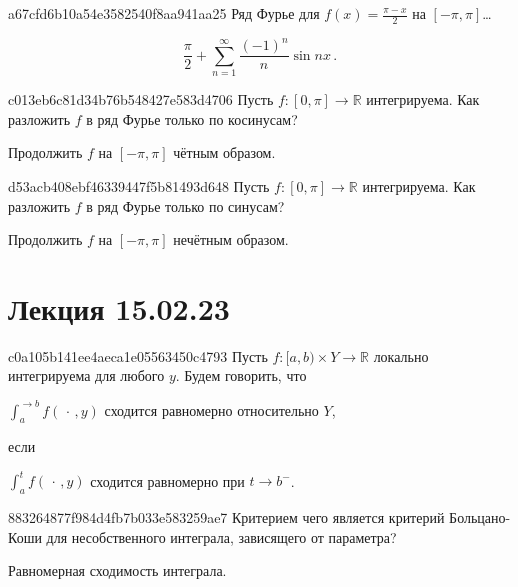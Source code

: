 \begin{note}{a67cfd6b10a54e3582540f8aa941aa25}
    Ряд Фурье для \({ f(x) = \frac{\pi - x}{2} }\) на \({ [-\pi, \pi] }\)\ldots

    \begin{cloze}{1}
        \[
            \frac{\pi}{2} + \sum_{n=1}^{\infty} \frac{(-1)^{n}}{n} \sin nx\,.
        \]
    \end{cloze}
\end{note}

\begin{note}{c013eb6c81d34b76b548427e583d4706}
    Пусть \({ f : [0, \pi] \to \mathbb R }\) интегрируема.
    Как разложить \({ f }\) в ряд Фурье только по косинусам?

    \begin{cloze}{1}
        Продолжить \({ f }\) на \({ [-\pi, \pi] }\) чётным образом.
    \end{cloze}
\end{note}

\begin{note}{d53acb408ebf46339447f5b81493d648}
    Пусть \({ f : [0, \pi] \to \mathbb R }\) интегрируема.
    Как разложить \({ f }\) в ряд Фурье только по синусам?

    \begin{cloze}{1}
        Продолжить \({ f }\) на \({ [-\pi, \pi] }\) нечётным образом.
    \end{cloze}
\end{note}

\section{Лекция 15.02.23}
\begin{note}{c0a105b141ee4aeca1e05563450c4793}
    Пусть \({ f : [a, b) \times Y \to \mathbb R }\) локально интегрируема для любого \({ y }\).
    Будем говорить, что \begin{icloze}{2}\({ \int_{a}^{\to b} f(\,\cdot\,, y) }\) сходится равномерно относительно \({ Y }\),\end{icloze} если
    \begin{icloze}{1}\({ \int_{a}^{t} f(\,\cdot\,, y) }\) сходится равномерно при \({ t \to b^{-} }\).\end{icloze}
\end{note}

\begin{note}{883264877f984d4fb7b033e583259ae7}
    Критерием чего является критерий Больцано-Коши для несобственного интеграла, зависящего от параметра?

    \begin{cloze}{1}
        Равномерная сходимость интеграла.
    \end{cloze}
\end{note}

